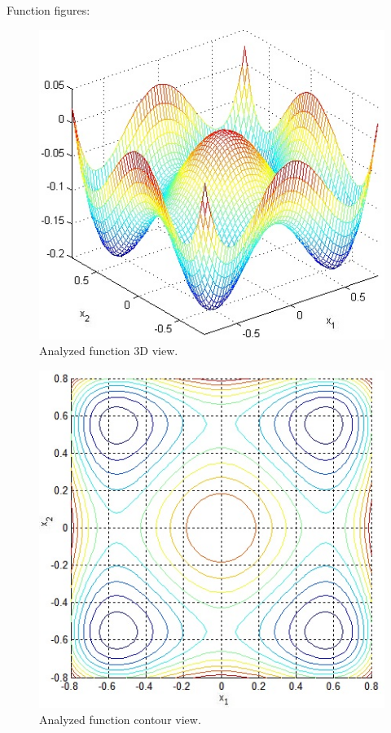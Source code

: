 \documentclass[12pt]{article}
\begin{document}
Function figures:
	\begin{figure}[H]
		\begin{center}
			\includegraphics[width=12cm]{four_3d.jpg}
		\caption{Analyzed function 3D view.}
		\end{center}
	\end{figure}
	\begin{figure}[H]
		\begin{center}
			\includegraphics[width=12cm]{four_cont.jpg}
			\caption{Analyzed function contour view.}
		\end{center}
	\end{figure}	
\end{document}
